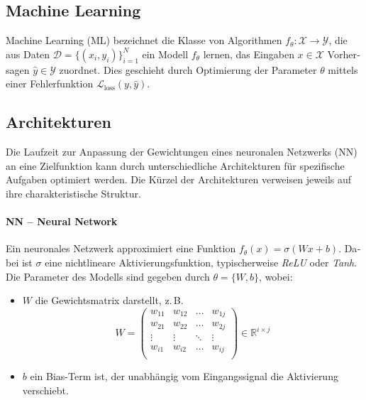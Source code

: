 \begin{otherlanguage}{ngerman}
\section{Machine Learning}

Machine Learning (ML) bezeichnet die Klasse von Algorithmen \( f_{\theta} : \mathcal{X} \rightarrow \mathcal{Y} \), die aus Daten 
\( \mathcal{D} = \{ (x_i, y_i) \}_{i=1}^{N} \) ein Modell \( f_{\theta} \) lernen, das Eingaben \( x \in \mathcal{X} \) Vorhersagen \( \hat{y} \in \mathcal{Y} \) zuordnet. Dies geschieht durch Optimierung der Parameter \( \theta \) mittels einer Fehlerfunktion \( \mathcal{L}_{\text{loss}}(y, \hat{y}) \).

\subsection{Architekturen}

Die Laufzeit zur Anpassung der Gewichtungen eines neuronalen Netzwerks (NN) an eine Zielfunktion kann durch unterschiedliche Architekturen für spezifische Aufgaben optimiert werden. Die Kürzel der Architekturen verweisen jeweils auf ihre charakteristische Struktur.

\paragraph{NN – Neural Network}
Ein neuronales Netzwerk approximiert eine Funktion \( f_{\theta}(x) = \sigma(Wx + b) \). Dabei ist \( \sigma \) eine nichtlineare Aktivierungsfunktion, typischerweise \textit{ReLU} oder \textit{Tanh}. Die Parameter des Modells sind gegeben durch \( \theta = \{ W, b \} \), wobei:

\begin{itemize}
  \item \( W \) die Gewichtsmatrix darstellt, z.\,B. 
    \[
      W = 
      \begin{pmatrix}
        w_{11} & w_{12} & \dots  & w_{1j} \\
        w_{21} & w_{22} & \dots  & w_{2j} \\
        \vdots & \vdots & \ddots & \vdots \\
        w_{i1} & w_{i2} & \dots  & w_{ij} \\
      \end{pmatrix}
      \in \mathbb{R}^{i \times j}
    \]
  \item \( b \) ein Bias-Term ist, der unabhängig vom Eingangssignal die Aktivierung verschiebt.
\end{itemize}


\end{otherlanguage}
